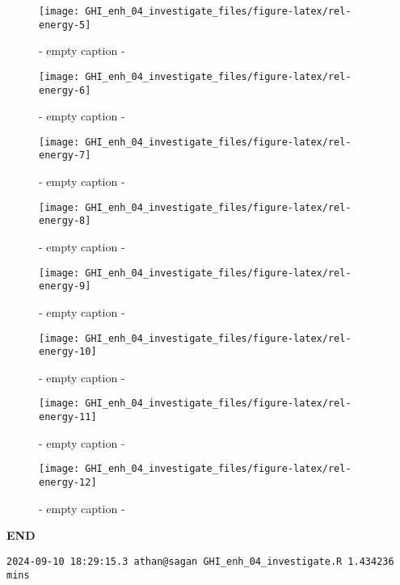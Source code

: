 \documentclass[
  10pt,
  a4paper,oneside]{article}
\begin{document}
\begin{figure}[H]

{\centering \texttt{[image: GHI\_enh\_04\_investigate\_files/figure-latex/rel-energy-5]} 

}

\caption{ - empty caption - }\label{fig:rel-energy-5}
\end{figure}
\begin{figure}[H]

{\centering \texttt{[image: GHI\_enh\_04\_investigate\_files/figure-latex/rel-energy-6]} 

}

\caption{ - empty caption - }\label{fig:rel-energy-6}
\end{figure}
\begin{figure}[H]

{\centering \texttt{[image: GHI\_enh\_04\_investigate\_files/figure-latex/rel-energy-7]} 

}

\caption{ - empty caption - }\label{fig:rel-energy-7}
\end{figure}
\begin{figure}[H]

{\centering \texttt{[image: GHI\_enh\_04\_investigate\_files/figure-latex/rel-energy-8]} 

}

\caption{ - empty caption - }\label{fig:rel-energy-8}
\end{figure}
\begin{figure}[H]

{\centering \texttt{[image: GHI\_enh\_04\_investigate\_files/figure-latex/rel-energy-9]} 

}

\caption{ - empty caption - }\label{fig:rel-energy-9}
\end{figure}
\begin{figure}[H]

{\centering \texttt{[image: GHI\_enh\_04\_investigate\_files/figure-latex/rel-energy-10]} 

}

\caption{ - empty caption - }\label{fig:rel-energy-10}
\end{figure}
\begin{figure}[H]

{\centering \texttt{[image: GHI\_enh\_04\_investigate\_files/figure-latex/rel-energy-11]} 

}

\caption{ - empty caption - }\label{fig:rel-energy-11}
\end{figure}
\begin{figure}[H]

{\centering \texttt{[image: GHI\_enh\_04\_investigate\_files/figure-latex/rel-energy-12]} 

}

\caption{ - empty caption - }\label{fig:rel-energy-12}
\end{figure}

\textbf{END}

\begin{verbatim}
2024-09-10 18:29:15.3 athan@sagan GHI_enh_04_investigate.R 1.434236 mins
\end{verbatim}
\end{document}
